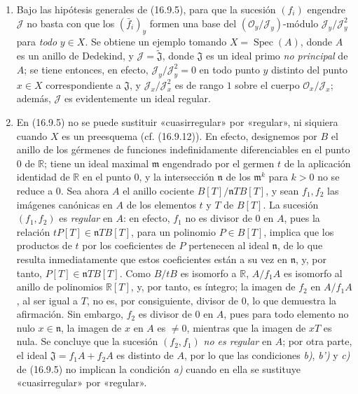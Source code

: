 \begin{remarks}[16.9.6]
\label{IV.16.9.6}
\begin{enumerate}
  \item[(i)] Bajo las hipótesis generales de (16.9.5), para que la sucesión
  $(f_i)$ engendre $\mathscr J$ no basta con que los $(\bar f_i)_y$ formen
  una base del $(\mathcal{O}_y/\mathscr J_y)$-módulo
  $\mathscr J_y/\mathscr J_y^2$ para \emph{todo} $y\in X$. Se obtiene un ejemplo
  tomando
  $X=\operatorname{Spec}(A)$, donde $A$ es un anillo de Dedekind, y
  $\mathscr J=\widetilde{\mathfrak J}$, donde $\mathfrak J$ es un ideal
  primo \emph{no principal} de $A$; se tiene entonces, en efecto,
  $\mathscr J_y/\mathscr J_y^2=0$ en todo punto $y$ distinto del punto
  $x\in X$ correspondiente a $\mathfrak J$, y
  $\mathscr J_x/\mathscr J_x^2$ es de rango $1$ sobre el cuerpo
  $\mathcal{O}_x/\mathscr J_x$; además, $\mathscr J$ es evidentemente un
  ideal regular.
  \item[(ii)] En (16.9.5) no se puede sustituir «cuasirregular» por
  «regular», ni siquiera cuando $X$ es un preesquema (cf. (16.9.12)). En
  efecto, designemos por $B$ el anillo de los gérmenes de funciones
  indefinidamente diferenciables en el punto $0$ de $\mathbb{R}$; tiene un
  ideal maximal $\mathfrak{m}$ engendrado por el germen $t$ de la aplicación
  identidad de $\mathbb{R}$ en el punto $0$, y la intersección $\mathfrak{n}$
  de los $\mathfrak{m}^k$ para $k>0$ no se reduce a $0$. Sea ahora $A$ el
  anillo cociente $B[T]/\mathfrak{n}TB[T]$, y sean $f_1,f_2$ las imágenes
  canónicas en $A$ de los elementos $t$ y $T$ de $B[T]$. La sucesión
  $(f_1,f_2)$ es \emph{regular} en $A$: en efecto, $f_1$ no es divisor de $0$ en
  $A$, pues la relación $tP[T]\in\mathfrak{n}TB[T]$, para un polinomio
  $P\in B[T]$, implica que los productos de $t$ por los coeficientes de $P$
  pertenecen al ideal $\mathfrak{n}$, de lo que resulta inmediatamente que
  estos coeficientes están a su vez en $\mathfrak{n}$, y, por tanto,
  $P[T]\in\mathfrak{n}TB[T]$. Como $B/tB$ es isomorfo a $\mathbb{R}$,
  $A/f_1A$ es isomorfo al anillo de polinomios $\mathbb{R}[T]$, y, por tanto,
  es íntegro; la imagen de $f_2$ en $A/f_1A$, al ser igual a $T$, no es, por
  consiguiente, divisor de $0$, lo que demuestra la afirmación. Sin embargo,
  $f_2$ es divisor de $0$ en $A$, pues para todo elemento no nulo
  $x\in\mathfrak{n}$, la imagen de $x$ en $A$ es $\ne0$, mientras que la
  imagen de $xT$ es nula. Se concluye que la sucesión $(f_2,f_1)$ \emph{no es
  regular} en $A$; por otra parte, el ideal $\mathfrak J=f_1A+f_2A$ es
  distinto de $A$, por lo que las condiciones \emph{b)}, \emph{b')} y \emph{c)} de (16.9.5) no
  implican la condición \emph{a)} cuando en ella se sustituye «cuasirregular» por
  «regular».
\end{enumerate}
\end{remarks}

